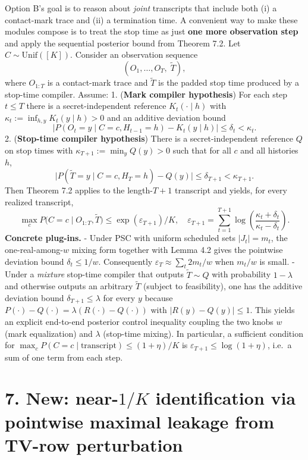 \documentclass[11pt]{article}
\begin{document}
Option B's goal is to reason about \emph{joint} transcripts that include
both (i) a contact-mark trace and (ii) a termination time. A convenient
way to make these modules compose is to treat the stop time as just
\textbf{one more observation step} and apply the sequential posterior
bound from Theorem 7.2. Let \(C\sim \mathrm{Unif}([K])\). Consider an
observation sequence \[
(O_1,\dots,O_T,\; \widetilde T),
\] where \(O_{1:T}\) is a contact-mark trace and \(\widetilde T\) is the
padded stop time produced by a stop-time compiler. Assume: 1.
(\textbf{Mark compiler hypothesis}) For each step \(t\le T\) there is a
secret-independent reference \(K_t(\cdot\mid h)\) with
\(\kappa_t:= \inf_{h,y} K_t(y\mid h) > 0\) and an additive deviation
bound \[
\bigl|P(O_t=y\mid C=c,H_{t-1}=h) - K_t(y\mid h)\bigr| \le \delta_t < \kappa_t.
\] 2. (\textbf{Stop-time compiler hypothesis}) There is a
secret-independent reference \(Q\) on stop times with
\(\kappa_{T+1}:=\min_y Q(y) > 0\) such that for all \(c\) and all
histories \(h\), \[
\bigl|P(\widetilde T=y\mid C=c, H_T=h) - Q(y)\bigr| \le \delta_{T+1} < \kappa_{T+1}.
\] Then Theorem 7.2 applies to the length-\(T{+}1\) transcript and
yields, for every realized transcript, \[
\max_c P\bigl(C=c\mid O_{1:T},\widetilde T\bigr) \le \exp(\varepsilon_{T+1})/K,
\quad
\varepsilon_{T+1}=\sum_{t=1}^{T+1}\log\!\left(\frac{\kappa_t+\delta_t}{\kappa_t-\delta_t}\right).
\] \textbf{Concrete plug-ins.} - Under PSC with uniform scheduled sets
\(|J_t|=m_t\), the one-real-among-\(w\) mixing form together with Lemma
4.2 gives the pointwise deviation bound \(\delta_t\le 1/w\).
Consequently \(\varepsilon_T \approx \sum_t 2m_t/w\) when \(m_t/w\) is
small. - Under a \emph{mixture} stop-time compiler that outputs
\(\widetilde T\sim Q\) with probability \(1-\lambda\) and otherwise
outputs an arbitrary \(\widetilde T\) (subject to feasibility), one has
the additive deviation bound \(\delta_{T+1}\le \lambda\) for every \(y\)
because \(P(\cdot)-Q(\cdot)=\lambda(R(\cdot)-Q(\cdot))\) with
\(|R(y)-Q(y)|\le 1\). This yields an explicit end-to-end posterior
control inequality coupling the two knobs \(w\) (mark equalization) and
\(\lambda\) (stop-time mixing). In particular, a sufficient condition
for \(\max_c P(C=c\mid \text{transcript}) \le (1+\eta)/K\) is
\(\varepsilon_{T+1} \le \log(1+\eta)\), i.e.~a sum of one term from each
step.

\hypertarget{new-near-1k-identification-via-pointwise-maximal-leakage-from-tv-row-perturbation}{%
\section{\texorpdfstring{7. New: near-\(1/K\) identification via
pointwise maximal leakage from TV-row
perturbation}{7. New: near-1/K identification via pointwise maximal leakage from TV-row perturbation}}\label{new-near-1k-identification-via-pointwise-maximal-leakage-from-tv-row-perturbation}}
\end{document}
